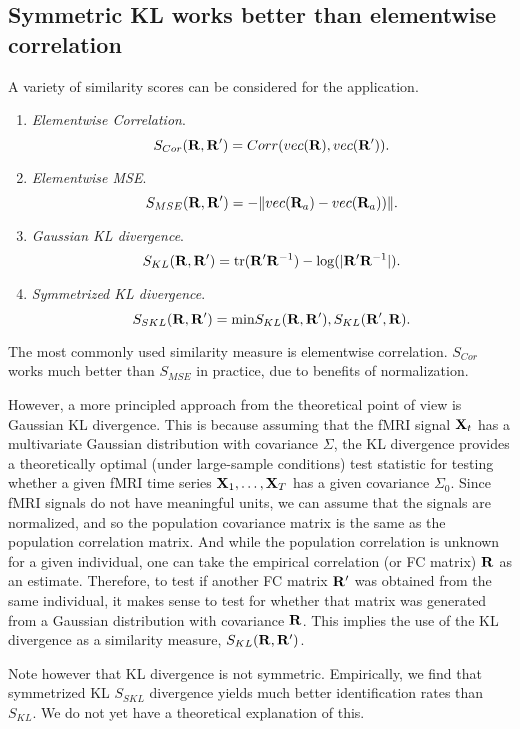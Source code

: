 \documentclass[12pt]{article}
\begin{document}
\subsection{Symmetric KL works better than elementwise correlation}

A variety of similarity scores can be considered for the application.
\begin{enumerate}
\item \emph{Elementwise Correlation}.  
\[S_{Cor}({\bf R}, {\bf R'}) =   Corr(vec({\bf R}),vec({\bf R}')).\]
\item \emph{Elementwise MSE}.  
\[S_{MSE}({\bf R}, {\bf R'}) =   -\|vec({\bf R}_a)-vec({\bf R}_a))\|.\]
\item \emph{Gaussian KL divergence}.  
\[S_{KL}({\bf R}, {\bf R'}) =\text{tr}({\bf R'} {\bf R}^{-1}) - \log(|{\bf R'} {\bf R}^{-1}|).\]
\item \emph{Symmetrized KL divergence}.  
\[S_{SKL}({\bf R}, {\bf R'}) =\text{min} S_{KL}({\bf R}, {\bf R'}), S_{KL}({\bf R'}, {\bf R}).\]
\end{enumerate}

The most commonly used similarity measure is elementwise correlation.
$S_{Cor}$ works much better than $S_{MSE}$ in practice, due to benefits of normalization.

However, a more principled approach from the theoretical point of view is Gaussian KL divergence.
This is because assuming that the fMRI signal ${\bf X}_t$ has a multivariate Gaussian distribution with covariance $\Sigma$, the KL divergence provides a theoretically optimal (under large-sample conditions) test statistic for testing whether a given fMRI time series ${\bf X}_1,\hdots, {\bf X}_T$ has a given covariance $\Sigma_0$.  Since fMRI signals do not have meaningful units, we can assume that the signals are normalized, and so the population covariance matrix is the same as the population correlation matrix.  And while the population correlation is unknown for a given individual, one can take the empirical correlation (or FC matrix) ${\bf R}$ as an estimate.  Therefore, to test if another FC matrix ${\bf R}'$ was obtained from the same individual, it makes sense to test for whether that matrix was generated from a Gaussian distribution with covariance ${\bf R}$.  This implies the use of the KL divergence as a similarity measure, $S_{KL}({\bf R}, {\bf R'})$.

Note however that KL divergence is not symmetric.  Empirically, we find that symmetrized KL $S_{SKL}$ divergence yields much better identification rates than $S_{KL}$.  We do not yet have a theoretical explanation of this.
\end{document}
